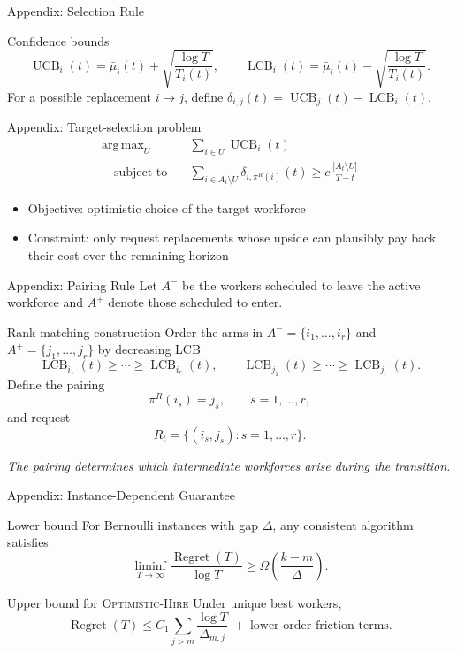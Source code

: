 \documentclass[10pt,aspectratio=169]{beamer}
\newcommand{\OH}{\textsc{Optimistic-Hire}}
\newcommand{\UCB}{\operatorname{UCB}}
\newcommand{\LCB}{\operatorname{LCB}}
\newcommand{\Regret}{\operatorname{Regret}}
\DeclareMathOperator*{\argmax}{arg\,max}
\begin{document}
\begin{frame}{Appendix: Selection Rule}
\small
\begin{block}{Confidence bounds}
\[
\UCB_i(t)=\bar{\mu}_i(t)+\sqrt{\frac{\log T}{T_i(t)}},
\qquad
\LCB_i(t)=\bar{\mu}_i(t)-\sqrt{\frac{\log T}{T_i(t)}}.
\]
For a possible replacement \(i\to j\), define \(\delta_{i,j}(t)=\UCB_j(t)-\LCB_i(t)\).
\end{block}

\begin{block}{Appendix: Target-selection problem}
\begin{align*}
    \argmax_U &\quad \sum_{i\in U}\UCB_i(t)\\
\quad\text{subject to}&\quad
\sum_{i\in A_t\setminus U}\delta_{i,\pi^R(i)}(t)\ge c\,\frac{|A_t\setminus U|}{T-t}
\end{align*}
\end{block}

\begin{itemize}
    \item Objective: optimistic choice of the target workforce
    \item Constraint: only request replacements whose upside can plausibly pay back their cost over the remaining horizon
\end{itemize}
\end{frame}

\begin{frame}[t]{Appendix: Pairing Rule}
    \small
    Let \(A^-\) be the workers scheduled to leave the active workforce and \(A^+\) denote those scheduled to enter.
    \begin{block}{Rank-matching construction}
    Order the arms in \(A^-=\{i_1,\dots,i_r\}\) and \(A^+=\{j_1,\dots,j_r\}\) by decreasing LCB
    \[
    \LCB_{i_1}(t)\ge \cdots \ge \LCB_{i_r}(t),
    \qquad
    \LCB_{j_1}(t)\ge \cdots \ge \LCB_{j_r}(t).
    \]
    Define the pairing
    \[
    \pi^R(i_s)=j_s,\qquad s=1,\dots,r,
    \]
    and request
    \[
    R_t=\{(i_s,j_s):s=1,\dots,r\}.
    \]
    \end{block}

    \begin{center}
    \emph{The pairing determines which intermediate workforces arise during the transition.}
    \end{center}
\end{frame}

\begin{frame}[t]{Appendix: Instance-Dependent Guarantee}
\small
\begin{block}{Lower bound}
For Bernoulli instances with gap \(\Delta\), any consistent algorithm satisfies
\[
\liminf_{T\to\infty}\frac{\Regret(T)}{\log T}\ge \Omega\!\left(\frac{k-m}{\Delta}\right).
\]
\end{block}

\begin{block}{Upper bound for \OH}
Under unique best workers,
\[
\Regret(T)
\le
C_1\sum_{j>m}\frac{\log T}{\Delta_{m,j}}
\;+\;
\text{lower-order friction terms}.
\]
\end{block}
\end{frame}
\end{document}
